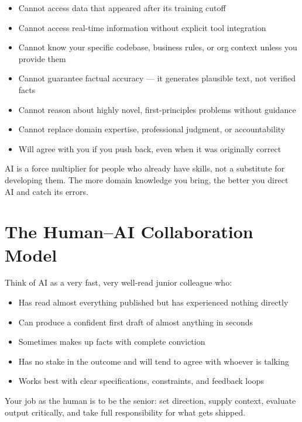 \begin{warnbox}
\begin{itemize}
  \item Cannot access data that appeared after its training cutoff
  \item Cannot access real-time information without explicit tool integration
  \item Cannot know your specific codebase, business rules, or org context unless you
        provide them
  \item Cannot guarantee factual accuracy --- it generates plausible text, not verified facts
  \item Cannot reason about highly novel, first-principles problems without guidance
  \item Cannot replace domain expertise, professional judgment, or accountability
  \item Will agree with you if you push back, even when it was originally correct
\end{itemize}
\end{warnbox}

AI is a force multiplier for people who already have skills, not a substitute for
developing them. The more domain knowledge you bring, the better you direct AI and
catch its errors.

\section{The Human--AI Collaboration Model}
\label{sec:collaboration}

Think of AI as a very fast, very well-read junior colleague who:

\begin{itemize}
  \item Has read almost everything published but has experienced nothing directly
  \item Can produce a confident first draft of almost anything in seconds
  \item Sometimes makes up facts with complete conviction
  \item Has no stake in the outcome and will tend to agree with whoever is talking
  \item Works best with clear specifications, constraints, and feedback loops
\end{itemize}

Your job as the human is to be the senior: set direction, supply context, evaluate
output critically, and take full responsibility for what gets shipped.
